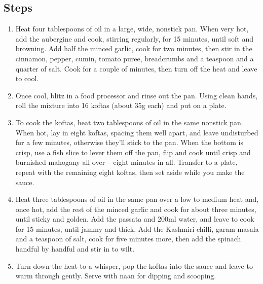 \documentclass{book}
\begin{document}
\subsection*{Steps}
\begin{enumerate}
\item Heat four tablespoons of oil in a large, wide, nonstick pan. When very hot, add the aubergine and cook, stirring regularly, for 15 minutes, until soft and browning. Add half the minced garlic, cook for two minutes, then stir in the cinnamon, pepper, cumin, tomato puree, breadcrumbs and a teaspoon and a quarter of salt. Cook for a couple of minutes, then turn off the heat and leave to cool.
\item Once cool, blitz in a food processor and rinse out the pan. Using clean hands, roll the mixture into 16 koftas (about 35g each) and put on a plate.
\item To cook the koftas, heat two tablespoons of oil in the same nonstick pan. When hot, lay in eight koftas, spacing them well apart, and leave undisturbed for a few minutes, otherwise they’ll stick to the pan. When the bottom is crisp, use a fish slice to lever them off the pan, flip and cook until crisp and burnished mahogany all over – eight minutes in all. Transfer to a plate, repeat with the remaining eight koftas, then set aside while you make the sauce.
\item Heat three tablespoons of oil in the same pan over a low to medium heat and, once hot, add the rest of the minced garlic and cook for about three minutes, until sticky and golden. Add the passata and 200ml water, and leave to cook for 15 minutes, until jammy and thick. Add the Kashmiri chilli, garam masala and a teaspoon of salt, cook for five minutes more, then add the spinach handful by handful and stir in to wilt.
\item Turn down the heat to a whisper, pop the koftas into the sauce and leave to warm through gently. Serve with naan for dipping and scooping.
\end{enumerate}
\newpage
\end{document}
